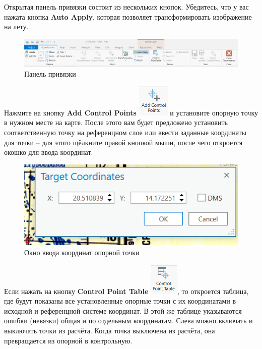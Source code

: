 \documentclass[
  12pt,
]{book}
\begin{document}
Открытая панель привязки состоит из нескольких кнопок. Убедитесь, что у вас нажата кнопка \textbf{Auto Apply}, которая позволяет трансформировать изображение на лету.

\begin{figure}
\centering
\includegraphics{images/Ref02/Arc_georef_panel.png}
\caption{Панель привязки}
\end{figure}

Нажмите на кнопку \textbf{Add Control Points} \includegraphics{images/Ref02/Arc_add_control_points.png} и установите опорную точку в нужном месте на карте. После этого вам будет предложено установить соответственную точку на референцном слое или ввести заданные координаты для точки -- для этого щёлкните правой кнопкой мыши, после чего откроется окошко для ввода координат.

\begin{figure}
\centering
\includegraphics{images/Ref02/Arc_target_coords.png}
\caption{Окно ввода координат опорной точки}
\end{figure}

Если нажать на кнопку \textbf{Control Point Table} \includegraphics{images/Ref02/Arc_control_points_tab.png}, то откроется таблица, где будут показаны все установленные опорные точки с их координатами в исходной и референцной системе координат. В этой же таблице указываются ошибки (невязки) общая и по отдельным координатам. Слева можно включать и выключать точки из расчёта. Когда точка выключена из расчёта, она превращается из опорной в контрольную.
\end{document}
